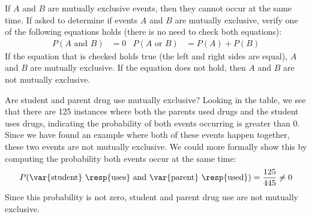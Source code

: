 \begin{tipBox}{
If $A$ and $B$ are mutually exclusive events, then they cannot occur at the same time. If asked to determine if events $A$ and $B$ are mutually exclusive, verify one of the following equations holds (there is no need to check both equations):
\begin{align*}
P(A \text{ and }B) &= 0&
P(A\text{ or }B) &= P(A) + P(B)
\end{align*}
If the equation that is checked holds true (the left and right sides are equal), $A$ and $B$ are mutually exclusive. If the equation does not hold, then $A$ and $B$ are not mutually exclusive.}
\end{tipBox}


\begin{example}{Are student and parent drug use mutually exclusive?}
Looking in the table, we see that there are 125 instances where both the parents used drugs and the student uses drugs, indicating the probability of both events occurring is greater than 0. Since we have found an example where both of these events happen together, these two events are not mutually exclusive. We could more formally show this by computing the probability both events occur at the same time:
\begin{align*}
P(\text{\var{student} \resp{uses} and \var{parent} \resp{used}}) = \frac{125}{445}\neq 0
\end{align*}
Since this probability is not zero, student and parent drug use are not mutually exclusive.
\end{example}

